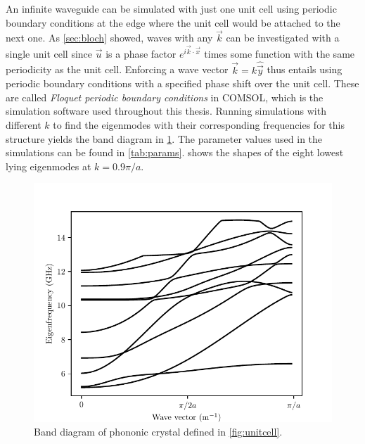 An infinite waveguide can be simulated with just one unit cell using periodic
boundary conditions at the edge where the unit cell would be attached to the
next one.
As \cref{sec:bloch} showed,
waves with any $\vec k$ can be investigated with a single unit cell since
$\vec u$ is a phase factor $e^{i\vec k \cdot \vec x}$ times some function with the
same periodicity as the unit cell.
Enforcing a wave vector $\vec k = k\hat{\vec y}$
thus entails using periodic boundary conditions with a specified phase shift
over the unit cell.
These are called \emph{Floquet periodic boundary conditions} in COMSOL, which is
the simulation software used throughout this thesis.
Running simulations with different $k$
to find the eigenmodes with their
corresponding frequencies for this structure yields the band diagram in
\cref{fig:banddiagram}.
The parameter values used in the simulations can be found in \cref{tab:params}.
 shows the shapes of the eight lowest lying eigenmodes at
$k=0.9 \pi / a$.
\begin{figure}[htpb]
	\centering
	\includegraphics{chapters/theory/bandstructure.pdf}
	\caption{%
		Band diagram of phononic crystal defined in \cref{fig:unitcell}.
	}%
	\label{fig:banddiagram}
\end{figure}

